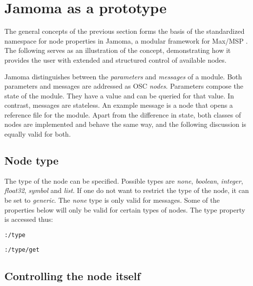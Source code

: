 \documentclass{NIME-alternate}
\begin{document}



\section{Jamoma as a prototype} %
\label{sec:prototype_implementation}

The general concepts of the previous section forms the basis of the standardized namespace for node properties in Jamoma, a modular framework for Max/MSP \cite{Place:2006}. The following serves as an illustration of the concept, demonstrating how it provides the user with extended and structured control of available nodes.

Jamoma distinguishes between the \emph{parameters} and \emph{messages} of a module.  Both parameters and messages are addressed as OSC \emph{nodes}.  Parameters compose the state of the module.  They have a value and can be queried for that value. In contrast, messages are stateless. An example message is a node that opens a reference file for the module. Apart from the difference in state, both classes of nodes are implemented and behave the same way, and the following discussion is equally valid for both. 



\subsection{Node type} %
\label{sub:type}

The type of the node can be specified. Possible types are \emph{none}, \emph{boolean}, \emph{integer}, \emph{float32}, \emph{symbol} and \emph{list}. If one do not want to restrict the type of the node, it can be set to \emph{generic}. The \emph{none} type is only valid for messages. Some of the properties below will only be valid for certain types of nodes. The type property is accessed thus:

\texttt{:/type}

\texttt{:/type/get}





\subsection{Controlling the node itself} %
\label{sub:controlling_the_node_itself}
\end{document}
